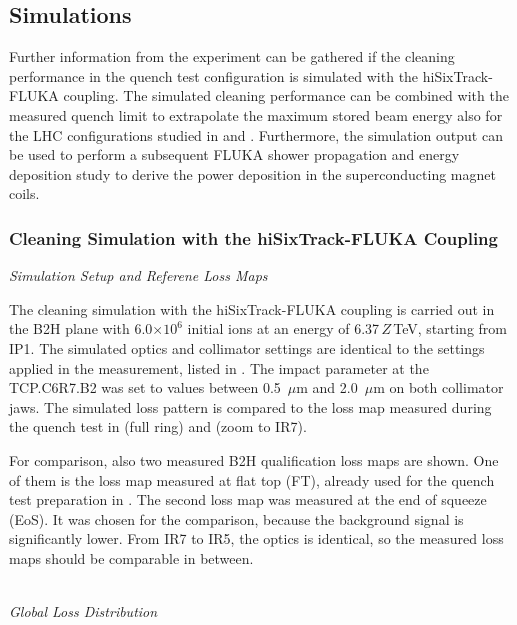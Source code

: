 \newpage

\subsection{Simulations}
Further information from the experiment can be gathered if the cleaning performance in the quench test configuration is simulated with the hiSixTrack-FLUKA coupling. The simulated cleaning performance can be combined with the measured quench limit to extrapolate the maximum stored beam energy also for the LHC configurations studied in  and . Furthermore, the simulation output can be used to perform a subsequent FLUKA shower propagation and energy deposition study to derive the power deposition in the superconducting magnet coils.

\subsubsection{Cleaning Simulation with the hiSixTrack-FLUKA Coupling}

\textit{Simulation Setup and Referene Loss Maps}
\vspace{0.2cm}

The cleaning simulation with the hiSixTrack-FLUKA coupling is carried out in the B2H plane with 6.0$\times 10^6$ initial \lead ions at an energy of 6.37$\,Z\,$TeV, starting from IP1. The simulated optics and collimator settings are identical to the settings applied in the measurement, listed in . The impact parameter at the TCP.C6R7.B2 was set to values between 0.5~$\mu$m and 2.0~$\mu$m on both collimator jaws. The simulated loss pattern is compared to the loss map measured during the quench test in  (full ring) and  (zoom to IR7). 
\vspace{0.2cm}

For comparison, also two measured B2H qualification loss maps are shown. One of them is the loss map measured at flat top (FT), already used for the quench test preparation in . The second loss map was measured at the end of squeeze (EoS). It was chosen for the comparison, because the background signal is significantly lower. From IR7 to IR5, the optics is identical, so the measured loss maps should be comparable in between.

 \mbox{} \\
\textit{Global Loss Distribution}
\vspace{0.2cm}

